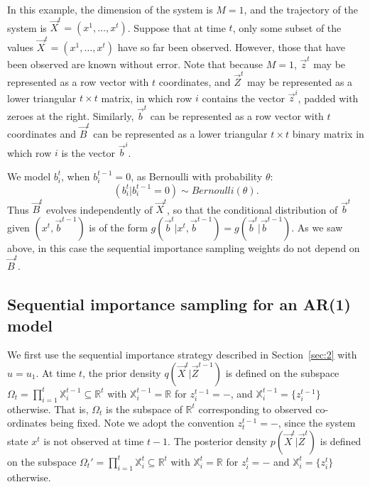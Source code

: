 In this example, the dimension of the system is $M = 1$, and the trajectory of the system is $\vec {X}^{t} = (x^1, \dots, x^{t})$. Suppose that at time $t$, only some subset of the values $\vec {X}^{t} = (x^1, \dots, x^{t})$ have so far been observed. However, those that have been observed are known without error. Note that because $M=1$, $\vec{z}^{t}$ may be represented as a row vector with $t$ coordinates, and $\vec{Z}^{t}$ may be represented as a lower triangular $t \times t$ matrix, in which row $i$ contains the vector $\vec{z}^{i}$, padded with zeroes at the right. Similarly, $\vec{b}^{t}$ can be represented as a row vector with $t$ coordinates and $\vec{B}^{t}$ can be represented as a lower triangular $t \times t$ binary matrix in which row $i$ is the vector $\vec{b}^{i}$.

We model $b_i^{t}$, when $b_i^{t-1} = 0$, as Bernoulli with probability $\theta$:
\begin{equation*}
    (b_i^{t} | b_i^{t-1} = 0) \sim Bernoulli(\theta).
\end{equation*}
Thus $\vec{B}^{t}$ evolves independently of $\vec{X}^{t}$, so that the conditional distribution of $\vec{b}^{t}$ given $(x^{t}, \vec{b}^{t-1})$ is of the form $g(\vec{b}^{t} | x^{t}, \vec{b}^{t-1} ) = g( \vec{b}^{t} | \vec{b}^{t-1} )$. As we saw above, in this case the sequential importance sampling weights do not depend on $\vec{B}^t$.





\subsection{Sequential importance sampling for an AR(1) model}
\label{sec:5}

We first use the sequential importance strategy described in Section~\ref{sec:2} with $u = u_1$. At time $t$, the prior density $q(\vec{X}^{t} | \vec{Z}^{t-1})$ is defined on the subspace $\Omega_t = \prod_{i=1}^t \mathbb{X}_i^{t-1} \subseteq \mathbb{R}^t$ with $\mathbb{X}_i^{t-1} = \mathbb{R}$ for $z_i^{t-1} = -$, and $\mathbb{X}_i^{t-1} = \{ z_i^{t-1} \}$ otherwise. That is, $\Omega_t$ is the subspace of $\mathbb{R}^t$ corresponding to observed co-ordinates being fixed. Note we adopt the convention $z_t^{t-1} = -$, since the system state $x^t$ is not observed at time $t-1$.  The posterior density $p(\vec{X}^{t} | \vec{Z}^{t})$ is defined on the subspace $\Omega_t' = \prod_{i=1}^t \mathbb{X}_i^{t} \subseteq \mathbb{R}^t$ with $\mathbb{X}_i^{t} = \mathbb{R}$ for $z_i^{t} = -$ and $\mathbb{X}_i^{t} = \{ z_i^{t}\}$ otherwise. 

